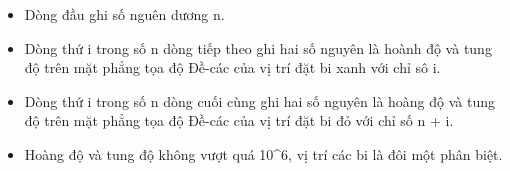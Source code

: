\begin{itemize}
	\item Dòng đầu ghi số nguên dương n.
	\item Dòng thứ i trong số n dòng tiếp theo ghi hai số nguyên là hoành độ và tung độ trên mặt phẳng tọa độ Đề-các của vị trí đặt bi xanh với chỉ sô i.
	\item Dòng thứ i trong số n dòng cuối cùng ghi hai số nguyên là hoàng độ và tung độ trên mặt phẳng tọa độ Đề-các của vị trí đặt bi đỏ với chỉ số n + i.
	\item Hoàng độ và tung độ không vượt quá 10^6, vị trí các bi là đôi một phân biệt.
\end{itemize}